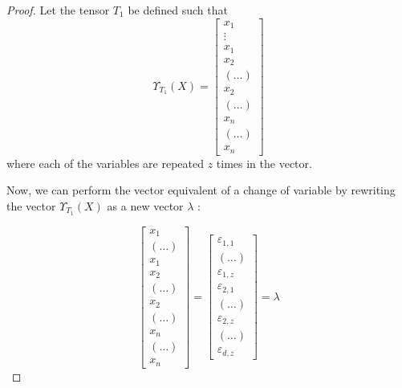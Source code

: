 \documentclass{article}
\theoremstyle{definition}
\theoremstyle{definition}
\begin{document}
\begin{proof}
Let the tensor $T_1$ be defined such that
\begin{equation}
    \Upsilon_{T_1}(X)
    = 
    \begin{bmatrix}
            x_1   \\
            \vdots  \\
            x_1 \\
            x_2 \\
            (\dots) \\
            x_2 \\
            (\dots) \\
            x_n   \\
            (\dots)  \\
            x_n 
    \end{bmatrix}
\end{equation}
where each of the variables are repeated $z$ times in the vector.

Now, we can perform the vector equivalent of a change of variable by rewriting the vector $\Upsilon_{T_1}(X)$ as a new vector $\lambda$ :

\begin{equation} \label{lambda}
    \begin{bmatrix}
        x_1   \\
        (\dots)  \\
        x_1 \\
        x_2 \\
        (\dots) \\
        x_2 \\
        (\dots) \\
        x_n   \\
        (\dots)  \\
        x_n 
\end{bmatrix}
    =
    \begin{bmatrix}
        \varepsilon_{1, 1} \\
        (\dots) \\
        \varepsilon_{1, z} \\
        \varepsilon_{2, 1} \\
        (\dots) \\
        \varepsilon_{2, z} \\
        (\dots) \\
        \varepsilon_{d, z} 
    \end{bmatrix}
    = \lambda
\end{equation}


\end{proof}
\end{document}
